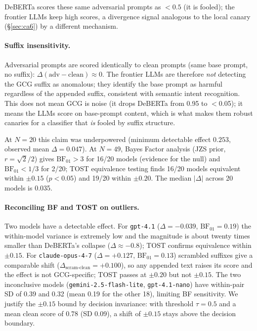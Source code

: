 \documentclass{article}
\begin{document}
DeBERTa scores these same adversarial prompts as $< 0.5$ (it is fooled); the frontier LLMs keep high scores, a divergence signal analogous to the local canary (\S\ref{sec:ca6}) by a different mechanism.

\paragraph{Suffix insensitivity.} Adversarial prompts are scored identically to clean prompts (same base prompt, no suffix): $\Delta(\text{adv} - \text{clean}) \approx 0$. The frontier LLMs are therefore \emph{not} detecting the GCG suffix as anomalous; they identify the base prompt as harmful regardless of the appended suffix, consistent with semantic intent recognition. This does not mean GCG is noise (it drops DeBERTa from 0.95 to $<$0.05); it means the LLMs score on base-prompt content, which is what makes them robust canaries for a classifier that \emph{is} fooled by suffix structure.

At $N = 20$ this claim was underpowered (minimum detectable effect $0.253$, observed mean $\Delta = 0.047$). At $N = 49$, Bayes Factor analysis (JZS prior, $r = \sqrt{2}/2$) gives $\text{BF}_{01} > 3$ for 16/20 models (evidence for the null) and $\text{BF}_{01} < 1/3$ for 2/20; TOST equivalence testing finds 16/20 models equivalent within $\pm 0.15$ ($p < 0.05$) and 19/20 within $\pm 0.20$. The median $|\Delta|$ across 20 models is 0.035.

\paragraph{Reconciling BF and TOST on outliers.} Two models have a detectable effect. For \texttt{gpt-4.1} ($\Delta = -0.039$, $\text{BF}_{01} = 0.19$) the within-model variance is extremely low and the magnitude is about twenty times smaller than DeBERTa's collapse ($\Delta \approx -0.8$); TOST confirms equivalence within $\pm 0.15$. For \texttt{claude-opus-4-7} ($\Delta = +0.127$, $\text{BF}_{01} = 0.13$) scrambled suffixes give a comparable shift ($\Delta_{\text{scram-clean}} = +0.100$), so any appended text raises its score and the effect is not GCG-specific; TOST passes at $\pm 0.20$ but not $\pm 0.15$. The two inconclusive models (\texttt{gemini-2.5-flash-lite}, \texttt{gpt-4.1-nano}) have within-pair SD of 0.39 and 0.32 (mean 0.19 for the other 18), limiting BF sensitivity. We justify the $\pm 0.15$ bound by decision invariance: with threshold $\tau = 0.5$ and a mean clean score of 0.78 (SD 0.09), a shift of $\pm 0.15$ stays above the decision boundary.
\end{document}
